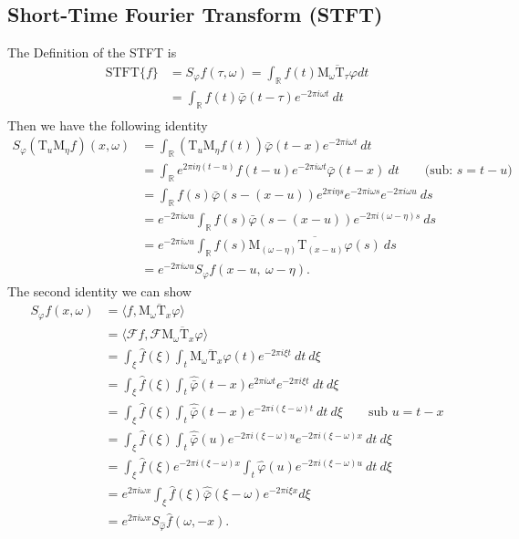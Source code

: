 \documentclass[a4paper]{article}
\begin{document}
\subsection{Short-Time Fourier Transform (STFT)}
The Definition of the STFT is
\begin{align}
    \text{STFT}\{f\} &= S_\varphi f(\tau, \omega) = \int_\mathbb{R} f(t)
    \overline{\text{M}_\omega \text{T}_\tau \varphi}dt \\
                 &=\int_\mathbb{R} f(t)
    \bar{\varphi}(t - \tau)e^{-2\pi i \omega t}\ dt \\
\end{align}
Then we have the following identity
\begin{align}
    S_\varphi(\text{T}_u\text{M}_\eta f)(x,\omega)
    &= \int_\mathbb{R}
     \left(\text{T}_u \text{M}_\eta f(t)\right) \bar{\varphi}(t-x) e^{-2\pi i
         \omega t}\ dt\\
    &= \int_\mathbb{R} e^{2\pi i \eta(t-u)}f(t-u) e^{-2\pi i \omega
    t}\bar{\varphi}(t-x)\ dt \qquad \text{(sub: $s = t-u$)}\\
    &= \int_\mathbb{R} f(s)\bar{\varphi}(s-(x-u))e^{2\pi i \eta s}e^{-2\pi i
    \omega s} e^{-2\pi i \omega u}\ ds \\
    &=e^{-2\pi i \omega u}\int_\mathbb{R} f(s) \bar{\varphi}(s-(x-u))e^{-2\pi i
    (\omega - \eta)s}\ ds\\
    &=e^{-2\pi i \omega u}\int_\mathbb{R}
    f(s)\overline{ \text{M}_{(\omega-\eta)} \text{T}_{(x-u)}\varphi(s)}\ ds\\
    &=e^{-2\pi i \omega u} S_\varphi f\left(x-u,\ \omega -\eta\right).
\end{align}
The second identity we can show
\begin{align}
    S_\varphi f(x, \omega)
    &= \langle f, \overline{\text{M}_\omega \text{T}_x \varphi}\rangle \\
    &= \langle\mathcal{F} f, \mathcal{F} \overline{\text{M}_\omega \text{T}_x \varphi}\rangle \\
    &= \int_\xi \hat{f}(\xi)\int_t \overline{\text{M}_\omega \text{T}_x
    \varphi}(t) e^{-2\pi i \xi t}\ dt\ d\xi \\
    &= \int_\xi \hat{f}(\xi)\int_t \hat{\bar{\varphi}}(t-x) e^{2\pi i \omega
    t} e^{-2\pi i \xi t}\ dt\ d\xi \\
    &= \int_\xi \hat{f}(\xi)\int_t \hat{\bar{\varphi}}(t-x)e^{-2\pi i (\xi
    -\omega)t}\ dt\ d\xi \qquad \text{sub $u=t-x$}\\
    &= \int_\xi \hat{f}(\xi)\int_t \hat{\bar{\varphi}}(u)e^{-2\pi i (\xi
    -\omega)u}e^{-2\pi i (\xi -\omega)x} \ dt\ d\xi\\
    &= \int_\xi \hat{f}(\xi)e^{-2\pi i (\xi -\omega)x}\int_t
    \hat{\varphi}(u)e^{-2\pi i (\xi -\omega)u} \ dt\ d\xi\\ &= e^{2\pi i
    \omega x}\int_\xi \hat{f}(\xi) \hat{\bar{\varphi}}(\xi - \omega) e^{-2\pi
    i \xi x}d\xi\\
    &= e^{2\pi i \omega x} S_{\hat{\varphi}} \hat{f}(\omega, -x).
\end{align}
\end{document}

